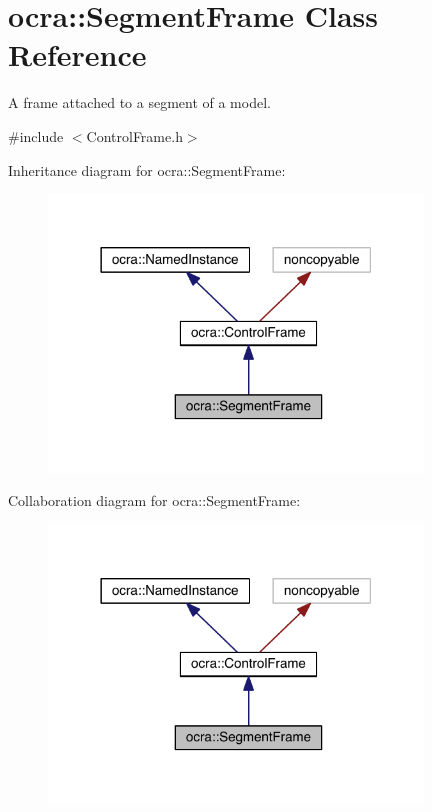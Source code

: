 \hypertarget{classocra_1_1SegmentFrame}{}\section{ocra\+:\+:Segment\+Frame Class Reference}
\label{classocra_1_1SegmentFrame}


A frame attached to a segment of a model.  




{\ttfamily \#include $<$Control\+Frame.\+h$>$}



Inheritance diagram for ocra\+:\+:Segment\+Frame\+:\nopagebreak
\begin{figure}[H]
\begin{center}
\leavevmode
\includegraphics[width=282pt]{d0/d24/classocra_1_1SegmentFrame__inherit__graph}
\end{center}
\end{figure}


Collaboration diagram for ocra\+:\+:Segment\+Frame\+:\nopagebreak
\begin{figure}[H]
\begin{center}
\leavevmode
\includegraphics[width=282pt]{dc/d5a/classocra_1_1SegmentFrame__coll__graph}
\end{center}
\end{figure}
